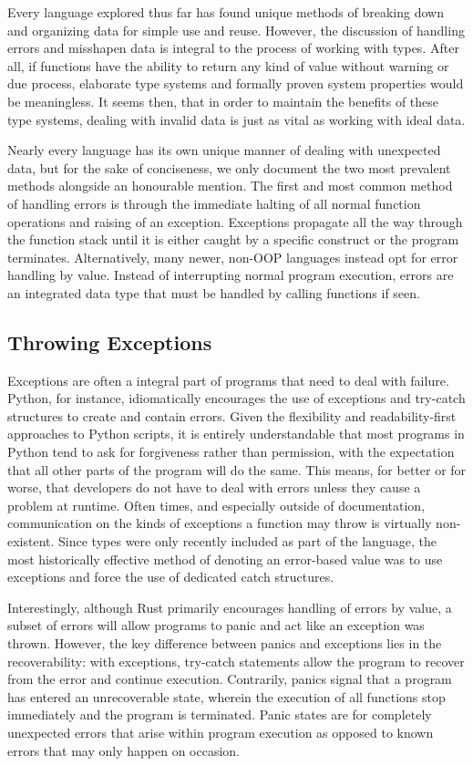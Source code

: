 \documentclass{article}
\begin{document}
Every language explored thus far has found unique methods of breaking down and organizing data for simple use and reuse.
However, the discussion of handling errors and misshapen data is integral to the process of working with types.
After all, if functions have the ability to return any kind of value without warning or due process,
elaborate type systems and formally proven system properties would be meaningless. It seems then, that in order to
maintain the benefits of these type systems, dealing with invalid data is just as vital as working with ideal data.

Nearly every language has its own unique manner of dealing with unexpected data, but for the sake of conciseness,
we only document the two most prevalent methods alongside an honourable mention. The first and most common
method of handling errors is through the immediate halting of all normal function operations and raising of an exception.
Exceptions propagate all the way through the function stack until it is either caught by a specific construct
or the program terminates. Alternatively, many newer, non-OOP languages instead opt for error handling by value.
Instead of interrupting normal program execution, errors are an integrated data type
that must be handled by calling functions if seen.

\subsection{Throwing Exceptions}

Exceptions are often a integral part of programs that need to deal with failure. Python, for instance, idiomatically
encourages the use of exceptions and try-catch structures to create and contain errors.
Given the flexibility and readability-first approaches to Python scripts, it is entirely understandable that
most programs in Python tend to ask for forgiveness rather than permission, with the expectation that all other parts of
the program will do the same. This means, for better or for worse, that developers do not have to deal with errors
unless they cause a problem at runtime. Often times, and especially outside of documentation,
communication on the kinds of exceptions a function may throw is virtually non-existent.
Since types were only recently included as part of the language, the most historically effective method of
denoting an error-based value was to use exceptions and force the use of dedicated catch structures.

Interestingly, although Rust primarily encourages handling of errors by value, a subset of errors will allow programs
to panic and act like an exception was thrown. However, the key difference between panics and exceptions
lies in the recoverability: with exceptions, try-catch statements allow the program to recover
from the error and continue execution. Contrarily, panics signal that a program has entered an unrecoverable state,
wherein the execution of all functions stop immediately and the program is terminated.
Panic states are for completely unexpected errors that arise within program execution as opposed to known errors
that may only happen on occasion.
\end{document}
